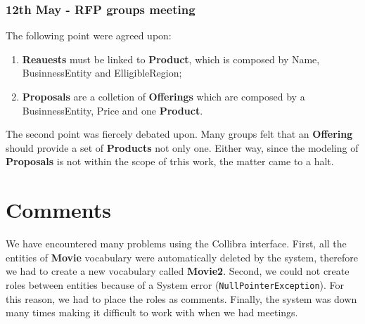 \documentclass[a4paper,10pt]{article}
\begin{document}
\subsubsection*{12th May - RFP groups meeting}
The following point were agreed upon:
\begin{enumerate}
  \item \textbf{Reauests} must be linked to \textbf{Product}, which is composed by Name, BusinnessEntity and ElligibleRegion;
  \item \textbf{Proposals} are a colletion of \textbf{Offerings} which are composed by a BusinnessEntity, Price and one \textbf{Product}.
\end{enumerate}
The second point was fiercely debated upon. Many groups felt that an \textbf{Offering} should provide a set of \textbf{Products} not only one. Either way, since the modeling of \textbf{Proposals} is not within the scope of trhis work, the matter came to a halt.


\section{Comments}
We have encountered many problems using the Collibra interface. First, all the entities of \textbf{Movie} vocabulary were automatically deleted by the system, therefore we had to create a new vocabulary called \textbf{Movie2}. Second, we could not create roles between entities because of a System error (\verb+NullPointerException+). For this reason, we had to place the roles as comments. Finally, the system was down many times making it difficult to work with when we had meetings. 
\end{document}
